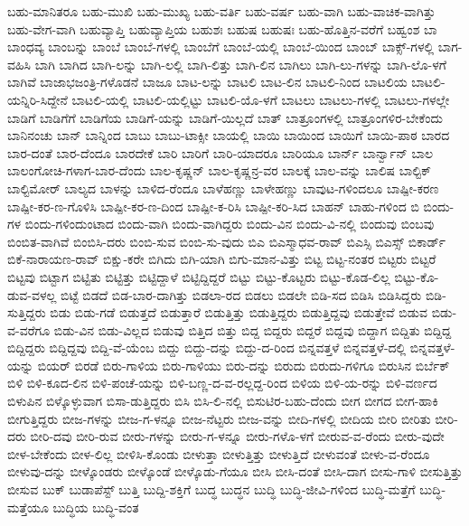 {ಬಹು-ಮಾನಿತರೂ
ಬಹು-ಮುಖಿ
ಬಹು-ಮುಖ್ಯ
ಬಹು-ವರ್ತಿ
ಬಹು-ವರ್ಷ
ಬಹು-ವಾಗಿ
ಬಹು-ವಾಚಿಕ-ವಾಗಿತ್ತು
ಬಹು-ವೇಗ-ವಾಗಿ
ಬಹುವ್ಯಾಪ್ತಿ
ಬಹುವ್ಯಾಪ್ತಿಯ
ಬಹುಶಃ
ಬಹುಷ
ಬಹುಷಃ
ಬಹು-ಹೊತ್ತಿನ-ವರೆಗೆ
ಬಹ್ವಂಶ
ಬಾ
ಬಾಂಧವ್ಯ
ಬಾಂಬನ್ನು
ಬಾಂಬೆ
ಬಾಂಬೆ-ಗಳಲ್ಲಿ
ಬಾಂಬೆಗೆ
ಬಾಂಬೆ-ಯಲ್ಲಿ
ಬಾಂಬೆ-ಯಿಂದ
ಬಾಂಬ್
ಬಾಕ್ಸ್-ಗಳಲ್ಲಿ
ಬಾಗ-ವಹಿಸಿ
ಬಾಗಿ
ಬಾಗಿದ
ಬಾಗಿ-ಲನ್ನು
ಬಾಗಿ-ಲಲ್ಲಿ
ಬಾಗಿ-ಲಿತ್ತು
ಬಾಗಿ-ಲಿನ
ಬಾಗಿಲು
ಬಾಗಿ-ಲು-ಗಳನ್ನು
ಬಾಗಿ-ಲೊ-ಳಗೆ
ಬಾಗಿವೆ
ಬಾಜಾಭಜಂತ್ರಿ-ಗಳೊಡನೆ
ಬಾಜೂ
ಬಾಟ-ಲನ್ನು
ಬಾಟಲಿ
ಬಾಟ-ಲಿನ
ಬಾಟಲಿ-ನಿಂದ
ಬಾಟಲಿಯ
ಬಾಟಲಿ-ಯನ್ನಿರಿ-ಸಿದ್ದೇನೆ
ಬಾಟಲಿ-ಯಲ್ಲಿ
ಬಾಟಲಿ-ಯಲ್ಲಿಟ್ಟು
ಬಾಟಲಿ-ಯೊ-ಳಗೆ
ಬಾಟಲು
ಬಾಟಲು-ಗಳಲ್ಲಿ
ಬಾಟಲು-ಗಳಲ್ಲೇ
ಬಾಡಿಗೆ
ಬಾಡಿಗೆಗೆ
ಬಾಡಿಗೆಯ
ಬಾಡಿಗೆ-ಯನ್ನು
ಬಾಡಿಗೆ-ಯಿಲ್ಲದೆ
ಬಾತ್
ಬಾತ್ರೂಂಗಳಲ್ಲಿ
ಬಾತ್ರೂಂಗಳಿರ-ಬೇಕೆಂದು
ಬಾನಿನಂಚು
ಬಾನ್
ಬಾನ್ನಿಂದ
ಬಾಬು
ಬಾಬು-ಟಾಕ್ಸೀ
ಬಾಯಲ್ಲಿ
ಬಾಯಿ
ಬಾಯಿಂದ
ಬಾಯಿಗೆ
ಬಾಯಿ-ಪಾಠ
ಬಾರದ
ಬಾರ-ದಂತೆ
ಬಾರ-ದೆಂದೂ
ಬಾರದೇಕೆ
ಬಾರಿ
ಬಾರಿಗೆ
ಬಾರಿ-ಯಾದರೂ
ಬಾರಿಯೂ
ಬಾರ್ನ್
ಬಾರ್ನ್ವಾನ್
ಬಾಲ
ಬಾಲಂಗೋಚಿ-ಗಳಾಗ-ಬಾರ-ದೆಂದು
ಬಾಲ-ಕೃಷ್ಣನ್
ಬಾಲ-ಕೃಷ್ಣನ್ರ-ವರ
ಬಾಲಕ್ಕೆ
ಬಾಲ-ವನ್ನು
ಬಾಲಿಷ
ಬಾಲ್ಟಿಕ್
ಬಾಲ್ಟಿಮೋರ್
ಬಾಲ್ಯದ
ಬಾಳನ್ನು
ಬಾಳಿದ-ರೆಂದೂ
ಬಾಳೆಹಣ್ಣು
ಬಾಳೇಹಣ್ಣು
ಬಾವುಟ-ಗಳಿಂದಲೂ
ಬಾಷ್ಪೀ-ಕರಣ
ಬಾಷ್ಪೀ-ಕರ-ಣ-ಗೊಳಿಸಿ
ಬಾಷ್ಪೀ-ಕರ-ಣ-ದಿಂದ
ಬಾಷ್ಪೀ-ಕ-ರಿಸಿ
ಬಾಷ್ಪೀ-ಕರಿ-ಸಿದ
ಬಾಹನ್
ಬಾಹು-ಗಳಿಂದ
ಬಿ
ಬಿಂದು-ಗಳ
ಬಿಂದು-ಗಳಿಂದುಂಟಾದ
ಬಿಂದು-ವಾಗಿ
ಬಿಂದು-ವಾಗಿದ್ದರು
ಬಿಂದು-ವಿನ
ಬಿಂದು-ವಿ-ನಲ್ಲಿ
ಬಿಂದುವು
ಬಿಂಬವು
ಬಿಂಬಿತ-ವಾಗಿವೆ
ಬಿಂಬಿಸಿ-ದರು
ಬಿಂಬಿ-ಸುವ
ಬಿಂಬಿ-ಸು-ವುದು
ಬಿಎ
ಬಿಎಸ್ಮಾಧವ-ರಾವ್
ಬಿಎಸ್ಸಿ
ಬಿಎಸ್ಸ್
ಬಿಕಾರ್ಡ್
ಬಿಕೆ-ನಾರಾಯಣ-ರಾವ್
ಬಿಕ್ಷು-ಕರೇ
ಬಿಗಿದು
ಬಿಗಿ-ಯಾಗಿ
ಬಿಗು-ಮಾನ-ವಿತ್ತು
ಬಿಟ್ಟ
ಬಿಟ್ಟ-ನಂತರ
ಬಿಟ್ಟರು
ಬಿಟ್ಟರೆ
ಬಿಟ್ಟವು
ಬಿಟ್ಟಾಗ
ಬಿಟ್ಟಿತು
ಬಿಟ್ಟಿತ್ತು
ಬಿಟ್ಟಿದ್ದಾಳೆ
ಬಿಟ್ಟಿದ್ದಿದ್ದರೆ
ಬಿಟ್ಟು
ಬಿಟ್ಟು-ಕೊಟ್ಟರು
ಬಿಟ್ಟು-ಕೊಡ-ಲಿಲ್ಲ
ಬಿಟ್ಟು-ಕೊ-ಡುವ-ವಳಲ್ಲ
ಬಿಟ್ಟೆ
ಬಿಡದೆ
ಬಿಡ-ಬಾರ-ದಾಗಿತ್ತು
ಬಿಡಲಾ-ರದ
ಬಿಡಲು
ಬಿಡಲೇ
ಬಿಡಿ-ಸದ
ಬಿಡಿಸಿ
ಬಿಡಿಸಿದ್ದರು
ಬಿಡಿ-ಸುತ್ತಿದ್ದರು
ಬಿಡು
ಬಿಡು-ಗಡೆ
ಬಿಡುತ್ತದೆ
ಬಿಡುತ್ತಾರೆ
ಬಿಡುತ್ತಿತ್ತು
ಬಿಡುತ್ತಿದ್ದರು
ಬಿಡುತ್ತಿದ್ದವು
ಬಿಡುತ್ತೇವೆ
ಬಿಡುವ
ಬಿಡು-ವ-ವರೆಗೂ
ಬಿಡು-ವಿನ
ಬಿಡು-ವಿಲ್ಲದ
ಬಿಡುವು
ಬಿತ್ತಿದ
ಬಿತ್ತು
ಬಿದ್ದ
ಬಿದ್ದರು
ಬಿದ್ದರೆ
ಬಿದ್ದವು
ಬಿದ್ದಾಗ
ಬಿದ್ದಿತು
ಬಿದ್ದಿದ್ದ
ಬಿದ್ದಿದ್ದರು
ಬಿದ್ದಿದ್ದವು
ಬಿದ್ದಿ-ವೆ-ಯೆಂಬ
ಬಿದ್ದು
ಬಿದ್ದು-ದನ್ನು
ಬಿದ್ದು-ದ-ರಿಂದ
ಬಿನ್ನವತ್ತಳೆ
ಬಿನ್ನವತ್ತಳೆ-ದಲ್ಲಿ
ಬಿನ್ನವತ್ತಳೆ-ಯನ್ನು
ಬಿಯರ್
ಬಿರಡೆ
ಬಿರು-ಗಾಳಿಯ
ಬಿರು-ಗಾಳಿಯು
ಬಿರು-ದನ್ನು
ಬಿರುದು
ಬಿರುದು-ಗಳಿಗೂ
ಬಿರುಸಿನ
ಬಿರ್ಬೆಕ್
ಬಿಳಿ
ಬಿಳಿ-ಕೂದ-ಲಿನ
ಬಿಳಿ-ಪಂಚೆ-ಯನ್ನು
ಬಿಳಿ-ಬಣ್ಣ-ದ-ವ-ರಲ್ಲದ್ದ-ರಿಂದ
ಬಿಳಿಯ
ಬಿಳಿ-ಯ-ರನ್ನು
ಬಿಳಿ-ವರ್ಣದ
ಬಿಳುಪಿನ
ಬಿಳ್ಕೊಳ್ಳುವಾಗ
ಬಿಸಾ-ಡುತ್ತಿದ್ದರು
ಬಿಸಿ
ಬಿಸಿ-ಲಿ-ನಲ್ಲಿ
ಬಿಸುಟಿರ-ಬಹು-ದೆಂದು
ಬೀಗ
ಬೀಗದ
ಬೀಗ-ಹಾಕಿ
ಬೀಗುತ್ತಿದ್ದರು
ಬೀಜ-ಗಳನ್ನು
ಬೀಜ-ಗ-ಳನ್ನೂ
ಬೀಜ-ನೆಟ್ಟರು
ಬೀಜ-ವನ್ನು
ಬೀದಿ-ಗಳಲ್ಲಿ
ಬೀದಿಯ
ಬೀರಿ
ಬೀರಿತು
ಬೀರಿ-ದರು
ಬೀರಿ-ದವು
ಬೀರಿ-ರುವ
ಬೀರು-ಗಳನ್ನು
ಬೀರು-ಗ-ಳನ್ನೂ
ಬೀರು-ಗಳೊ-ಳಗೆ
ಬೀರುವ-ವ-ರೆಂದು
ಬೀರು-ವುದೇ
ಬೀಳ-ಬೇಕೆಂದು
ಬೀಳ-ಲಿಲ್ಲ
ಬೀಳಿಸಿ-ಕೊಂಡು
ಬೀಳುತ್ತಾ
ಬೀಳುತ್ತಿತ್ತು
ಬೀಳುತ್ತಿದೆ
ಬೀಳುವಂತೆ
ಬೀಳು-ವ-ರೆಂದೂ
ಬೀಳುವು-ದನ್ನು
ಬೀಳ್ಕೊಂಡರು
ಬೀಳ್ಕೊಂಡೆ
ಬೀಳ್ಕೊಡು-ಗೆಯೂ
ಬೀಸಿ
ಬೀಸಿ-ದಂತೆ
ಬೀಸಿ-ದಾಗ
ಬೀಸು-ಗಾಳಿ
ಬೀಸುತ್ತಿತ್ತು
ಬೀಸುವ
ಬುಕ್
ಬುಡಾಪೆಸ್ಟ್
ಬುತ್ತಿ
ಬುದ್ದಿ-ಶಕ್ತಿಗೆ
ಬುದ್ಧ
ಬುದ್ಧನ
ಬುದ್ಧಿ
ಬುದ್ಧಿ-ಜೀವಿ-ಗಳಿಂದ
ಬುದ್ಧಿ-ಮತ್ತೆಗೆ
ಬುದ್ಧಿ-ಮತ್ತೆಯೂ
ಬುದ್ಧಿಯ
ಬುದ್ಧಿ-ವಂತ
}
